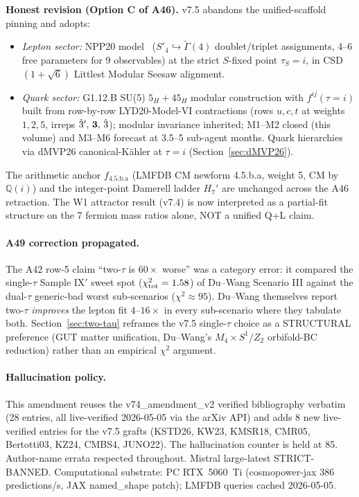 \documentclass[a4paper,11pt]{article}
\newcommand{\Spf}{S'_4}
\newcommand{\fLM}{f_{\text{4.5.b.a}}}
\newcommand{\Qi}{\mathbb{Q}(i)}
\theoremstyle{definition}
\theoremstyle{remark}
\begin{document}
\textbf{Honest revision (Option C of A46).}  v7.5 abandons the
unified-scaffold pinning and adopts:
\begin{itemize}
  \item \emph{Lepton sector:} NPP20 model~\cite{NPP20}
    ($\Spf\hookrightarrow\widetilde{\Gamma}(4)$ doublet/triplet
    assignments, 4--6 free parameters for 9 observables) at the
    strict $S$-fixed point $\tau_S=i$, in CSD$(1+\sqrt 6)$
    Littlest Modular Seesaw alignment.
  \item \emph{Quark sector:} G1.12.B SU(5) $5_H+45_H$ modular
    construction with $f^{ij}(\tau=i)$ built from row-by-row
    LYD20-Model-VI contractions (rows $u,c,t$ at weights $1,2,5$,
    irreps $\hat 3',\,{\bf 3},\,\hat 3$); modular invariance
    inherited; M1--M2 closed (this volume) and M3--M6 forecast at
    3.5--5 sub-agent months.  Quark hierarchies via dMVP26
    canonical-K\"ahler at $\tau=i$ (Section~\ref{sec:dMVP26}).
\end{itemize}
The arithmetic anchor $\fLM$ (LMFDB CM newform 4.5.b.a, weight 5,
CM by $\Qi$) and the integer-point Damerell ladder $H_7'$ are
unchanged across the A46 retraction.  The W1 attractor result
(v7.4) is now interpreted as a partial-fit structure on the 7
fermion mass ratios alone, NOT a unified Q+L claim.

\paragraph{A49 correction propagated.}  The A42 row-5 claim ``two-$\tau$
is $60\times$ worse'' was a category error: it compared the
single-$\tau$ Sample IX$'$ sweet spot ($\chi^2_{\rm tot}=1.58$) of
Du--Wang Scenario III against the dual-$\tau$ generic-bad worst
sub-scenarios ($\chi^2 \approx 95$).  Du--Wang
\cite[Tab.~5,~\S 4]{DuWang22} themselves report two-$\tau$
\emph{improves} the lepton fit $4$--$16\times$ in every
sub-scenario where they tabulate both.
Section~\ref{sec:two-tau} reframes the v7.5 single-$\tau$ choice
as a STRUCTURAL preference (GUT matter unification, Du--Wang's
$M_4\times S^1/Z_2$ orbifold-BC reduction) rather than an
empirical $\chi^2$ argument.

\paragraph{Hallucination policy.}  This amendment reuses the
v74\_amendment\_v2 verified bibliography verbatim (28 entries, all
live-verified 2026-05-05 via the arXiv API) and adds 8 new
live-verified entries for the v7.5 grafts (KSTD26, KW23, KMSR18,
CMR05, Bertotti03, KZ24, CMBS4, JUNO22).  The hallucination
counter is held at 85.  Author-name errata respected throughout.
Mistral large-latest STRICT-BANNED.  Computational substrate: PC
RTX~5060~Ti (cosmopower-jax 386 predictions/s, JAX named\_shape
patch); LMFDB queries cached 2026-05-05.
\end{document}
